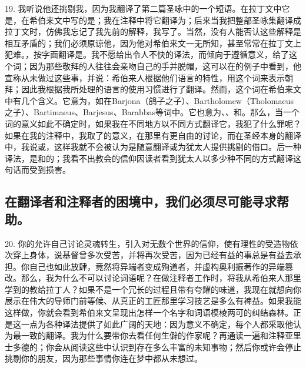 19. 我听说他还挑剔我，因为我翻译了第二篇圣咏中的一个短语。在拉丁文中它是，在希伯来文中写的是；我在注释中将它翻译为；后来当我把整部圣咏集翻译成拉丁文时，仿佛我忘记了我先前的解释，我写了。当然，没有人能否认这些解释是相互矛盾的；我们必须原谅他，因为他对希伯来文一无所知，甚至常常在拉丁文上犯难。，按字面翻译是。我不愿给出令人不快的译法，而倾向于遵循意义，给了这个词；因为那些敬拜的人往往会亲吻自己的手并脱帽，这可以在的例子中看到，他宣称从未做过这些事，并说：希伯来人根据他们语言的特性，用这个词来表示朝拜；因此我根据我所处理的语言的使用习惯进行了翻译。然而，这个词在希伯来文中有几个含义。它意为，如在Barjona（鸽子之子）、Bartholomew（Tholomaeus之子）、Bartimaeus、Barjesus、Barabbas等词中。它也意为、、和。那么，当一个词的意义如此不确定时，如果我在不同地方以不同方式翻译它，我犯了什么罪呢？如果在我的注释中，我取了的意义，在那里有更自由的讨论，而在圣经本身的翻译中，我说或，这样我就不会被认为是随意翻译或为犹太人提供挑剔的借口。后一种译法，是和的；我看不出教会的信仰因读者看到犹太人以多少种不同的方式翻译这句话而受到损害。\par


\subsection{在翻译者和注释者的困境中，我们必须尽可能寻求帮助。}

20. 你的允许自己讨论灵魂转生，引入对无数个世界的信仰，使有理性的受造物依次穿上身体，说基督曾多次受苦，并将再次受苦，因为已经有益的事总是有益去承担。你自己也如此放肆，竟然将异端者变成殉道者，并虚构奥利振著作的异端篡改。那么，我为什么不可以讨论词语呢？在做注释者工作时，将我从希伯来人那里学到的教给拉丁人？如果不是一个冗长的过程且带有夸耀的味道，我现在就想向你展示在伟大的导师门前等候、从真正的工匠那里学习技艺是多么有裨益。如果我能这样做，你就会看到希伯来文呈现出怎样一个名字和词语模棱两可的纠结森林。正是这一点为各种译法提供了如此广阔的天地：因为意义不确定，每个人都采取他认为最一致的翻译。我为什么要带你去看任何生僻的作家呢？再通读一遍和注释亚里士多德的；你会从阅读这些中认识到存在多么丰富的未知事物；然后你或许会停止挑剔你的朋友，因为那些事情你连在梦中都从未想过。\par

